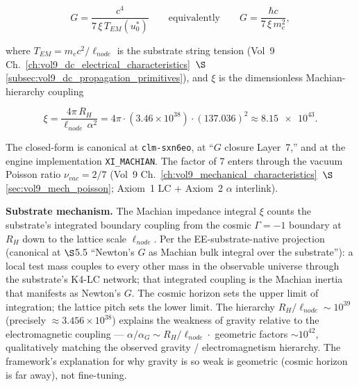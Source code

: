 \[
G = \frac{c^4}{7\, \xi\, T_{EM}(u_0^*)}
\qquad\text{equivalently}\qquad
G = \frac{\hbar c}{7\, \xi\, m_e^2},
\]

where $T_{EM} = m_e c^2 / \ell_{node}$ is the substrate string tension (Vol~9 Ch.~\ref{ch:vol9_dc_electrical_characteristics}~$\S$\ref{subsec:vol9_dc_propagation_primitives}), and $\xi$ is the dimensionless Machian-hierarchy coupling

\[
\xi = \frac{4\pi\, R_H}{\ell_{node}\,\alpha^2}
= 4\pi \cdot (3.46 \times 10^{38}) \cdot (137.036)^2
\approx \num{8.15e43}.
\]

The closed-form is canonical at  \texttt{clm-sxn6eo}, at  ``$G$ closure Layer~7,'' and at the engine implementation  \texttt{XI\_MACHIAN}. The factor of 7 enters through the vacuum Poisson ratio $\nu_{vac} = 2/7$ (Vol~9 Ch.~\ref{ch:vol9_mechanical_characteristics}~$\S$\ref{sec:vol9_mech_poisson}; Axiom~1 LC + Axiom~2 $\alpha$ interlink).

\textbf{Substrate mechanism.} The Machian impedance integral $\xi$ counts the substrate's integrated boundary coupling from the cosmic $\Gamma = -1$\gammaundeclared{} boundary at $R_H$ down to the lattice scale $\ell_{node}$. Per the EE-substrate-native projection (canonical at  $\S$5.5 ``Newton's $G$ as Machian bulk integral over the substrate''): a local test mass couples to every other mass in the observable universe through the substrate's K4-LC network; that integrated coupling is the Machian inertia that manifests as Newton's $G$. The cosmic horizon sets the upper limit of integration; the lattice pitch sets the lower limit. The hierarchy $R_H/\ell_{node} \sim 10^{39}$ (precisely $\approx 3.456\times10^{38}$) explains the weakness of gravity relative to the electromagnetic coupling --- $\alpha/\alpha_G \sim R_H/\ell_{node} \cdot$ geometric factors $\sim 10^{42}$, qualitatively matching the observed gravity / electromagnetism hierarchy. The framework's explanation for why gravity is so weak is geometric (cosmic horizon is far away), not fine-tuning.

